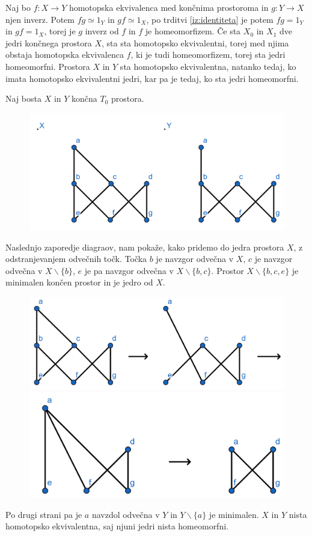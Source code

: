 \documentclass[mat1]{fmfdelo}
\begin{document}
\begin{dokaz}
    Naj bo $f:X\rightarrow Y$ homotopska ekvivalenca med 
    končnima prostoroma in $g:Y\rightarrow X$ njen inverz. 
    Potem $fg\simeq 1_Y$ in $gf \simeq 1_X$, po trditvi 
    \ref{iz:identiteta} je potem $fg = 1_Y$ in $gf = 1_X$,
    torej je $g$ inverz od $f$ in $f$ je homeomorfizem. Če 
    sta $X_0$ in $X_1$ dve jedri končnega prostora $X$, sta 
    sta homotopsko ekvivalentni, torej med njima obstaja homotopska ekvivalenca $f$, 
    ki je tudi homeomorfizem, torej sta jedri homeomorfni. 
    Prostora $X$ in $Y$ sta homotopsko ekvivalentna, 
    natanko tedaj, ko imata homotopsko ekvivalentni jedri, 
    kar pa je tedaj, ko sta jedri homeomorfni.
\end{dokaz}
\begin{primer}
    Naj bosta $X$ in $Y$ končna $T_0$ prostora.
    \begin{figure}[h]
        \centering
        \includegraphics[width=0.6\linewidth]{xy.png}
    \end{figure}

Naslednjo zaporedje diagraov, nam pokaže, kako pridemo do jedra prostora $X$, z odstranjevanjem odvečnih točk. Točka $b$ je navzgor odvečna v $X$, $c$ je navzgor odvečna v $X\backslash\{b\}$, $e$ je pa navzgor odvečna v $X\backslash\{b,c\}$. Prostor $X\backslash \{b,c,e\}$ je minimalen končen prostor in je jedro od $X$.

\begin{figure}[h]
    \centering
    \includegraphics[width=0.6\linewidth]{prv.png}
    \includegraphics[width=0.6\linewidth]{drug.png}
\end{figure}

Po drugi strani pa je $a$ navzdol odvečna v $Y$ in $Y\backslash \{a\}$ je minimalen. $X$ in $Y$ nista homotopsko ekvivalentna, saj njuni jedri nista homeomorfni.
\end{primer}
\end{document}
